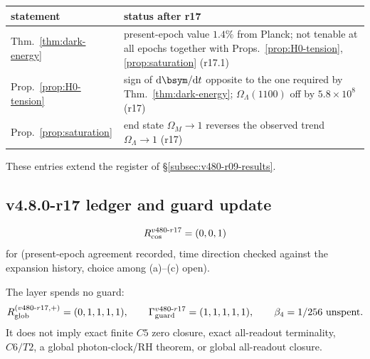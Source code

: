 \begin{center}
\small
\begin{tabular}{@{}>{\raggedright\arraybackslash}p{}>{\raggedright\arraybackslash}p{}@{}}
\toprule
statement & status after r17\\
\midrule
Thm.~\ref{thm:dark-energy} & present-epoch value \(1.4\%\) from Planck; not tenable at all epochs together with Props.~\ref{prop:H0-tension}, \ref{prop:saturation} (r17.1)\\
Prop.~\ref{prop:H0-tension} & sign of \(\mathrm d\bsym/\mathrm dt\) opposite to the one required by Thm.~\ref{thm:dark-energy}; \(\Omega_\Lambda(1100)\) off by \(5.8\times10^8\) (r17)\\
Prop.~\ref{prop:saturation} & end state \(\Omega_M\to1\) reverses the observed trend \(\Omega_\Lambda\to1\) (r17)\\
\bottomrule
\end{tabular}
\end{center}
These entries extend the register of \S\ref{subsec:v480-r09-results}.

\subsection*{v4.8.0-r17 ledger and guard update}
\label{subsec:v480-r17-ledger-guard}

\[
R_{\rm cos}^{v480\text{-}r17}=(0,0,1)
\]
for (present-epoch agreement recorded, time direction checked against the expansion history, choice among
(a)--(c) open).

The layer spends no guard:
\[
R_{\rm glob}^{(v480\text{-}r17,+)}=(0,1,1,1,1),
\qquad
\Gamma_{\rm guard}^{v480\text{-}r17}=(1,1,1,1,1),
\qquad
\beta_4=1/256\ \text{unspent}.
\]
It does not imply exact finite \(C5\) zero closure, exact all-readout terminality,
\(C6/T2\), a global photon-clock/RH theorem, or global all-readout closure.

